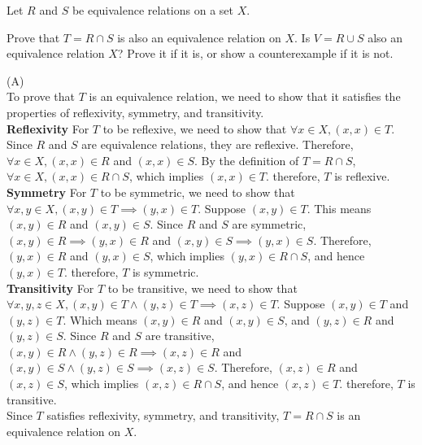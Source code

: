 \documentclass[solution,letterpaper]{cs20}
\begin{document}
    \begin{problem}

        Let $R$ and $S$ be equivalence relations on a set $X$.

        \subproblem Prove that $T=R \cap S$ is also an equivalence relation on $X$.
        \subproblem Is $V=R \cup S$ also an equivalence relation $X$?  Prove it if it is,
        or show a counterexample if it is not.

        \begin{solution}
        (A)\\
        To prove that \( T \) is an equivalence relation, we need to show that it satisfies the properties of reflexivity, symmetry, and transitivity. \\
        \textbf{Reflexivity}
        For \( T \) to be reflexive, we need to show that \(\forall x \in X, (x, x) \in T\). Since \( R \) and \( S \) are equivalence relations, they are reflexive. Therefore, \(\forall x \in X, (x, x) \in R\) and \((x, x) \in S\). By the definition of \( T = R \cap S \), \(\forall x \in X, (x, x) \in R \cap S\), which implies \((x, x) \in T\). therefore, \( T \) is reflexive.\\
        \textbf{Symmetry}
        For \( T \) to be symmetric, we need to show that \(\forall x, y \in X, (x, y) \in T \implies (y, x) \in T\). Suppose \((x, y) \in T\). This means \((x, y) \in R\) and \((x, y) \in S\). Since \( R \) and \( S \) are symmetric, \((x, y) \in R \implies (y, x) \in R\) and \((x, y) \in S \implies (y, x) \in S\). Therefore, \((y, x) \in R\) and \((y, x) \in S\), which implies \((y, x) \in R \cap S\), and hence \((y, x) \in T\). therefore, \( T \) is symmetric.\\
        \textbf{Transitivity}
        For \( T \) to be transitive, we need to show that \(\forall x, y, z \in X, (x, y) \in T \wedge (y, z) \in T \implies (x, z) \in T\). Suppose \((x, y) \in T\) and \((y, z) \in T\). Which means \((x, y) \in R\) and \((x, y) \in S\), and \((y, z) \in R\) and \((y, z) \in S\). Since \( R \) and \( S \) are transitive, \((x, y) \in R \wedge (y, z) \in R \implies (x, z) \in R\) and \((x, y) \in S \wedge (y, z) \in S \implies (x, z) \in S\). Therefore, \((x, z) \in R\) and \((x, z) \in S\), which implies \((x, z) \in R \cap S\), and hence \((x, z) \in T\). therefore, \( T \) is transitive. \\
        Since \( T \) satisfies reflexivity, symmetry, and transitivity, \( T = R \cap S \) is an equivalence relation on \( X \).


\end{solution}
\end{problem}
\end{document}
